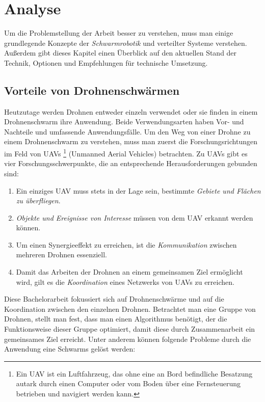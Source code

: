 \chapter{Analyse}
\label{cha:Analyse}

Um die Problemstellung der Arbeit besser zu verstehen, muss man einige grundlegende Konzepte der \textit{Schwarmrobotik} und verteilter Systeme verstehen. Außerdem gibt dieses Kapitel einen Überblick auf den aktuellen Stand der Technik, Optionen und Empfehlungen für technische Umsetzung.

\section{Vorteile von Drohnenschwärmen}
\label{cha:prosCons}

Heutzutage werden Drohnen entweder einzeln verwendet oder sie finden in einem Drohnenschwarm ihre Anwendung. Beide Verwendungsarten haben Vor- und Nachteile und umfassende Anwendungsfälle. Um den Weg von einer Drohne zu einem Drohnenschwarm zu verstehen, muss man zuerst die Forschungsrichtungen im Feld von UAVs \footnote{Ein UAV ist ein Luftfahrzeug, das ohne eine an Bord befindliche Besatzung autark durch einen Computer oder vom Boden über eine Fernsteuerung betrieben und navigiert werden kann.} (Unmanned Aerial Vehicles) betrachten. Zu UAVs gibt es vier Forschungsschwerpunkte, die an entsprechende Herausforderungen gebunden sind:

\begin{enumerate}
	\item Ein einziges UAV muss stets in der Lage sein, bestimmte \textit{Gebiete und Flächen zu überfliegen}.
	\item \textit{Objekte und Ereignisse von Interesse} müssen von dem UAV erkannt werden können.
	\item Um einen Synergieeffekt zu erreichen, ist die \textit{Kommunikation} zwischen mehreren Drohnen essenziell.
	\item Damit das Arbeiten der Drohnen an einem gemeinsamen Ziel ermöglicht wird, gilt es die \textit{Koordination} eines Netzwerks von UAVs zu erreichen.
\end{enumerate}

Diese Bachelorarbeit fokussiert sich auf Drohnenschwärme und auf die Koordination zwischen den einzelnen Drohnen. Betrachtet man eine Gruppe von Drohnen, stellt man fest, dass man einen Algorithmus benötigt, der die Funktionsweise dieser Gruppe optimiert, damit diese durch Zusammenarbeit ein gemeinsames Ziel erreicht. Unter anderem können folgende Probleme durch die Anwendung eine Schwarms gelöst werden:

